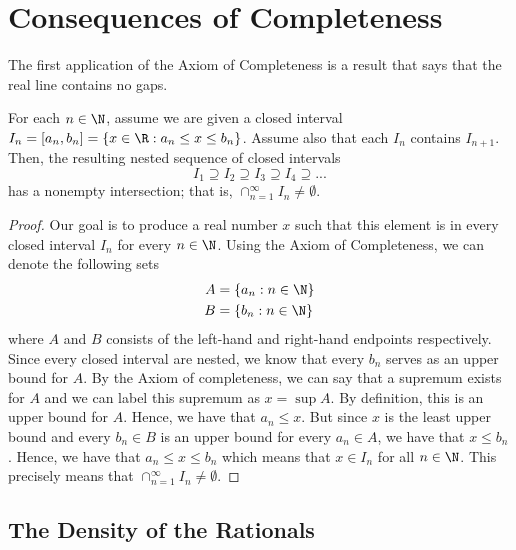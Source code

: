 % 

\section{Consequences of Completeness}

The first application of the Axiom of Completeness is a result that says that the real line contains no gaps. 

\begin{tcolorbox}
    \begin{thm}
        For each \( n \in \N \), assume we are given a closed interval \( I_n = [a_n, b_n ] = \{ x \in \R : a_n \leq x \leq b_n \} \). Assume also that each \( I_n \) contains \( I_{n+1}\). Then, the resulting nested sequence of closed intervals 
        \[ I_1 \supseteq I_2 \supseteq I_3 \supseteq I_4 \supseteq ... \]
        has a nonempty intersection; that is, \( \cap_{n=1}^{\infty} I_n \neq \emptyset \).
    \end{thm}
\end{tcolorbox}

\begin{proof}
    Our goal is to produce a real number \( x \) such that this element is in every closed interval \( I_n \) for every \( n \in \N \). Using the Axiom of Completeness, we can denote the following sets 
    \begin{align*} A &= \{  a_n : n \in \N  \} \\ 
                   B &= \{  b_n : n \in \N  \}
     \end{align*} 
    where \( A \) and \( B \) consists of the left-hand and right-hand endpoints respectively. Since every closed interval are nested, we know that every \( b_n \) serves as an upper bound for \( A \). By the Axiom of completeness, we can say that a supremum exists for \( A \) and we can label this supremum as \( x = \sup A \). By definition, this is an upper bound for \( A \). Hence, we have that \( a_n \leq x \). But since \( x \) is the least upper bound and every \( b_n \in B \) is an upper bound for every \( a_n \in A \), we have that \( x \leq b_n \). Hence, we have that \( a_n \leq x \leq b_n \) which means that \( x \in I_n \) for all \( n \in \N \). This precisely means that \( \cap_{n=1}^{\infty} I_n \neq \emptyset \).
\end{proof}

\subsection{The Density of the Rationals }

